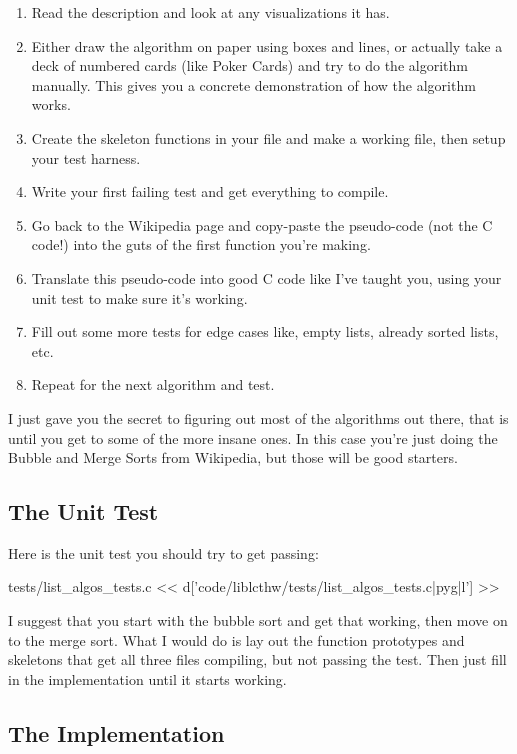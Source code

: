 \begin{enumerate}
\item Read the description and look at any visualizations it has.
\item Either draw the algorithm on paper using boxes and lines, or actually take a deck of numbered cards (like Poker Cards)
    and try to do the algorithm manually.  This gives you a concrete demonstration
    of how the algorithm works.
\item Create the skeleton functions in your  file and make a working  file, then setup
    your test harness.
\item Write your first failing test and get everything to compile.
\item Go back to the Wikipedia page and copy-paste the pseudo-code (not the C code!) into the guts of the first function you're making.
\item Translate this pseudo-code into good C code like I've taught you, using your unit test to make sure it's working.
\item Fill out some more tests for edge cases like, empty lists, already sorted lists, etc.
\item Repeat for the next algorithm and test.
\end{enumerate}

I just gave you the secret to figuring out most of the algorithms out there,
that is until you get to some of the more insane ones.  In this case you're
just doing the Bubble and Merge Sorts from Wikipedia, but those will be good
starters.

\subsection{The Unit Test}

Here is the unit test you should try to get passing:

\begin{code}{tests/list\_algos\_tests.c}
<< d['code/liblcthw/tests/list_algos_tests.c|pyg|l'] >>
\end{code}

I suggest that you start with the bubble sort and get that working, then move on to the merge sort.  What I would do is lay
out the function prototypes and skeletons that get all three files compiling, but not passing the test.  Then just fill in
the implementation until it starts working.

\subsection{The Implementation}

